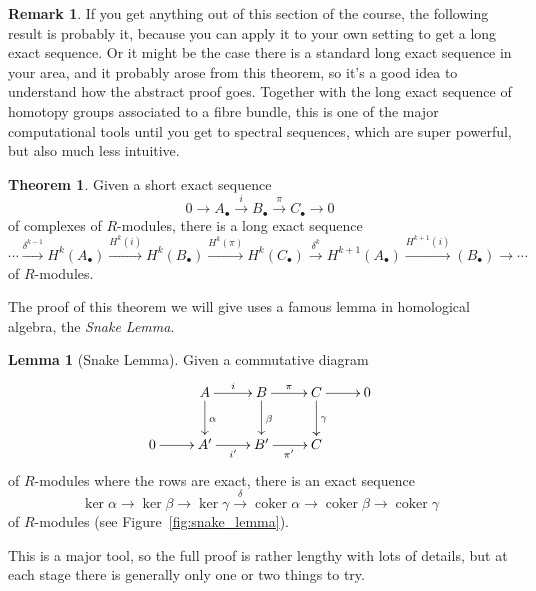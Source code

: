 \documentclass{tufte-handout}
\DeclareMathOperator{\coker}{coker}
\theoremstyle{definition}
\newtheorem{lemma}{Lemma}
\newtheorem{theorem}{Theorem}
\newtheorem*{rem}{Remark}
\begin{document}
\begin{rem}
If you get anything out of this section of the course, the following result is probably 
it, because you can apply it to your own setting to get a long exact sequence. Or it 
might be the case there is a standard long exact sequence in your area, and it 
probably arose from this theorem, so it's a good idea to understand how the abstract 
proof goes. Together with the long exact sequence of homotopy groups associated to a 
fibre bundle, this is one of the major computational tools until you get to spectral 
sequences, which are super powerful, but also much less intuitive.
\end{rem}

\begin{theorem}\label{thm:alg_Mayer-Vietoris}
Given a short exact sequence 
\[
        0\to A_\bullet \xrightarrow{i} B_\bullet \xrightarrow{\pi} C_\bullet \to 0
\]
of complexes of $R$-modules, there is a long exact sequence
\[
\cdots \xrightarrow{\delta^{k-1}} H^k(A_\bullet) \xrightarrow{H^k(i)} H^k(B_\bullet) \xrightarrow{H^k(\pi)} H^k(C_\bullet)
\xrightarrow{\delta^k} H^{k+1}(A_\bullet) \xrightarrow{H^{k+1}(i)} (B_\bullet) \to \cdots
\]
of $R$-modules.
\end{theorem}

The proof of this theorem we will give uses a famous lemma in homological algebra, the \emph{Snake 
Lemma}.

\begin{lemma}[Snake Lemma]
\label{snakeLemma}
Given a commutative diagram 
\[
	\xymatrix{
	& A \ar[r]^i \ar[d]^\alpha & B \ar[r]^\pi \ar[d]^\beta & C \ar[r] \ar[d]^\gamma & 0 \\
	0\ar[r] & A' \ar[r]_{i'} & B' \ar[r]_{\pi'} & C
	}
\]
of $R$-modules where the rows are exact, there is an exact sequence
\[
	\ker\alpha \to \ker\beta \to \ker\gamma \xrightarrow{\delta} \coker\alpha 
	\to \coker\beta \to \coker\gamma
\]
of $R$-modules (see Figure~\ref{fig:snake_lemma}).
\end{lemma}

This is a major tool, so the full proof is rather lengthy with lots of details, but at each stage there is generally
only one or two things to try.
\end{document}
